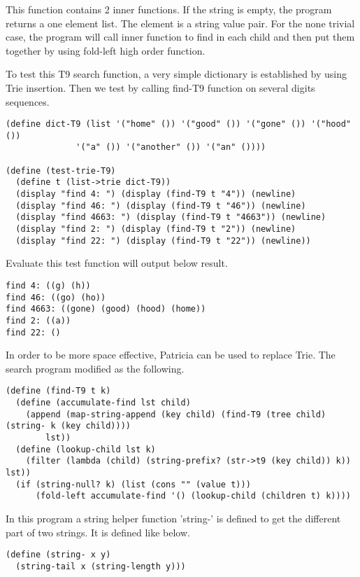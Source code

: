 \documentclass{article}
\begin{document}
This function contains 2 inner functions. If the string is empty, the
program returns a one element list. The element is a string value pair.
For the none trivial case, the program will call inner function to
find in each child and then put them together by using fold-left high
order function.

To test this T9 search function, a very simple dictionary is
established by using Trie insertion. Then we test by calling find-T9
function on several digits sequences.

\begin{lstlisting}
(define dict-T9 (list '("home" ()) '("good" ()) '("gone" ()) '("hood" ())
		      '("a" ()) '("another" ()) '("an" ())))

(define (test-trie-T9)
  (define t (list->trie dict-T9))
  (display "find 4: ") (display (find-T9 t "4")) (newline)
  (display "find 46: ") (display (find-T9 t "46")) (newline)
  (display "find 4663: ") (display (find-T9 t "4663")) (newline)
  (display "find 2: ") (display (find-T9 t "2")) (newline)
  (display "find 22: ") (display (find-T9 t "22")) (newline))
\end{lstlisting}

Evaluate this test function will output below result.

\begin{verbatim}
find 4: ((g) (h))
find 46: ((go) (ho))
find 4663: ((gone) (good) (hood) (home))
find 2: ((a))
find 22: ()
\end{verbatim}

In order to be more space effective, Patricia can be used to replace
Trie. The search program modified as the following.

\begin{lstlisting}
(define (find-T9 t k)
  (define (accumulate-find lst child)
    (append (map-string-append (key child) (find-T9 (tree child) (string- k (key child))))
	    lst))
  (define (lookup-child lst k)
    (filter (lambda (child) (string-prefix? (str->t9 (key child)) k)) lst))
  (if (string-null? k) (list (cons "" (value t)))
      (fold-left accumulate-find '() (lookup-child (children t) k))))
\end{lstlisting}

In this program a string helper function 'string-' is defined to get
the different part of two strings. It is defined like below.

\begin{lstlisting}
(define (string- x y)
  (string-tail x (string-length y)))
\end{lstlisting}
\end{document}
